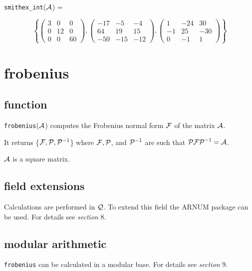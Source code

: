 {\tt smithex\_int}(${\cal A}$) =
\begin{center}
\begin{displaymath}
\left\{ \left( \begin{array}{ccc} 3 & 0 & 0 \\ 0 & 12 & 0 \\ 0 & 0 & 60
\end{array} \right), \left( \begin{array}{ccc} -17 & -5 & -4 \\ 64 & 19
& 15 \\ -50 & -15 & -12 \end{array} \right), \left( \begin{array}{ccc}
1 & -24 & 30 \\ -1 & 25 & -30 \\ 0 & -1 & 1 \end{array} \right) \right\}
\end{displaymath}
\end{center}


\section{frobenius}

\subsection{function}

{\tt frobenius}(${\cal A}$) computes the Frobenius normal form
${\cal F}$ of the matrix ${\cal A}$.

It returns \{${\cal F}, {\cal P}, {\cal P}^{-1}$\} where ${\cal F},
{\cal P}$, and ${\cal P}^{-1}$ are such that ${\cal P F P}^{-1} =
{\cal A}$.

${\cal A}$ is a square matrix.

\subsection{field extensions}

Calculations are performed in ${\cal Q}$. To extend this field the
{\small ARNUM} package can be used. For details see {\it section} 8.

\subsection{modular arithmetic}

{\tt frobenius} can be calculated in a modular base. For details see
{\it section} 9.

